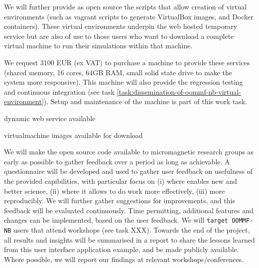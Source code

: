 \begin{workpackage}[id=UI,wphases=24-48,
  title=User Interfaces,
  PSRM=1,
  JURM=12, %
  LLRM=1, %
  SARM=1, %
  UKRM=1, %
  UBRM=1, %
  USORM=25]
\begin{tasklist}
\begin{task}[id=oommf-nb-ve,title=OOMMF case study: \OOMMFNB{} virtual environments]
  We will further provide as open source the scripts that allow
  creation of virtual environments (such as vagrant scripts to
  generate VirtualBox images, and Docker containers). These virtual
  environments underpin the web hosted temporary \OOMMFNB{}
  service but are also of use to those users who want to download a
  complete virtual machine to run their simulations within that
  machine.

  We request 3100 EUR (ex VAT) to purchase a machine to provide these
  services (shared memory, 16 cores, 64GB RAM, small solid state drive
  to make the system more responsive). This machine will also provide
  the regression testing and continuous integration (see task
  \ref{task:dissemination-of-oommf-nb-virtual-environment}). Setup and
  maintenance of the machine is part of this work task.
\end{task}
\end{tasklist}

\begin{wpdelivs}
  \begin{wpdeliv}[due=24,id=del:oommf-nb-tmp,dissem=??,nature=??]
      {\OOMMFNB{} dynamic web service available}
\end{wpdeliv}
  \begin{wpdeliv}[due=24,id=del:oommf-nb-virtual,dissem=??,nature=??]
      {\OOMMFNB{} virtualmachine images available for download}
\end{wpdeliv}
\end{wpdelivs}


\begin{tasklist}
\begin{task}[title=OOMMF case study: Evaluation and refinement]
  We will make the \OOMMFNB{} open source code available to
  micromagnetic research groups as early as possible to gather
  feedback over a period as long as achievable. A questionnaire will
  be developed and used to gather user feedback on usefulness of the
  provided capibilities, with particular focus on (i) where
  \OOMMFNB{} enables new and better science, (ii) where it
  allows to do work more effectively, (iii) more reproducibly. We will
  further gather suggestions for improvements, and this feedback will
  be evaluated continuously. Time permitting, additional features and
  changes can be implemented, based on the user feedback. We will
  \texttt{target OOMMF-NB} users that attend workshops (see task
  XXX). Towards the end of the project, all results and insights will
  be summarised in a report to share the lessons learned from this user
  interface application example, and be made publicly available. Where
  possible, we will report our findings at relevant
  workshops/conferences.
\end{task}
\end{tasklist}


\end{workpackage}
